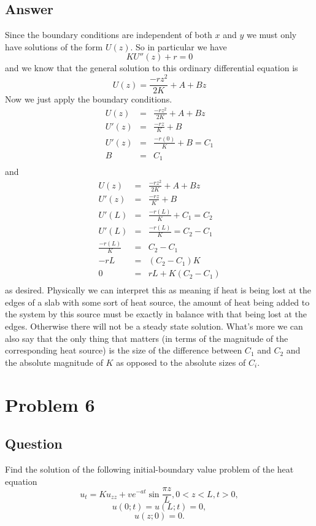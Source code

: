 \documentclass[12pt]{article}
\begin{document}
\subsection{Answer}
Since the boundary conditions are independent of both $x$ and $y$ we must only have solutions of the form $U(z)$. So in particular we have
\[K U''(z)+r=0\]
and we know that the general solution to this ordinary differential equation is
\[U(z)=\frac{-r z^2}{2 K}+A+B z\]
Now we just apply the boundary conditions.
\begin{eqnarray*}
U(z) &=& \frac{-r z^2}{2 K}+A+B z \\
U'(z) &=& \frac{-r z}{ K}+B \\
U'(z) &=& \frac{-r (0)}{ K}+B = C_1 \\
B &=& C_1 \\
\end{eqnarray*}
and
\begin{eqnarray*}
U(z) &=& \frac{-r z^2}{2 K}+A+B z \\
U'(z) &=& \frac{-r z}{ K}+B \\
U'(L) &=& \frac{-r (L)}{ K}+C_1 = C_2 \\
U'(L) &=& \frac{-r (L)}{ K}= C_2 - C_1 \\
\frac{-r (L)}{ K} &=& C_2 - C_1 \\
-r L &=& (C_2 - C_1)K \\
0 &=& r L + K (C_2 - C_1) \\
\end{eqnarray*}
as desired. Physically we can interpret this as meaning if heat is being lost at the edges of a slab with some sort of heat source, the amount of heat being added to the system by this source must be exactly in balance with that being lost at the edges. Otherwise there will not be a steady state solution. What's more we can also say that the only thing that matters (in terms of the magnitude of the corresponding heat source) is the size of the difference between $C_1$ and $C_2$ and the absolute magnitude of $K$ as opposed to the absolute sizes of $C_i$.



\section{Problem 6}
\subsection{Question}
Find the solution of the following initial-boundary value problem of the heat equation
\[u_t=K u_{zz} + v e^{-at} \sin{\frac{\pi z}{L}},  0<z<L, t>0,\]
\[u(0;t)=u(L;t)=0,\]
\[u(z;0)=0. \]
\end{document}
